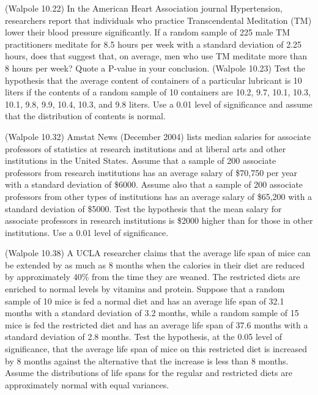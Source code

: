 \documentclass[14pt]{exam}
\begin{document}
\begin{questions}

            \question
            (Walpole 10.22)
            In the American Heart Association journal Hypertension, researchers report that individuals who practice Transcendental Meditation (TM) lower their blood pressure significantly. If a random sample of 225 male TM practitioners meditate for 8.5 hours per week with a standard deviation of 2.25 hours, does that suggest that, on average, men who use TM meditate more than 8 hours per week? Quote a P-value in your conclusion.
            \question
            (Walpole 10.23)
            Test the hypothesis that the average content of containers of a particular lubricant is 10 liters if the contents of a random sample of 10 containers are 10.2, 9.7, 10.1, 10.3, 10.1, 9.8, 9.9, 10.4, 10.3, and 9.8 liters. Use a 0.01 level of significance and assume that the distribution of contents is normal.

            \question
            (Walpole 10.32)
            Amstat News (December 2004) lists median salaries for associate professors of statistics at research institutions and at liberal arts and other institutions in the United States. Assume that a sample of 200 associate professors from research institutions has an average salary of \$70,750 per year with a standard deviation of \$6000. Assume also that a sample of 200 associate professors from other types of institutions has an average salary of \$65,200 with a standard deviation of \$5000. Test the hypothesis that the mean salary for associate professors in research institutions is \$2000 higher than for those in other institutions. Use a 0.01 level of significance.

            \question
            (Walpole 10.38)
            A UCLA researcher claims that the average life span of mice can be extended by as much as 8 months when the calories in their diet are reduced by approximately 40\% from the time they are weaned. The restricted diets are enriched to normal levels by vitamins and protein. Suppose that a random sample of 10 mice is fed a normal diet and has an average life span of 32.1 months with a standard deviation of 3.2 months, while a random sample of 15 mice is fed the restricted diet and has an average life span of 37.6 months with a standard deviation of 2.8 months. Test the hypothesis, at the 0.05 level of significance, that the average life span of mice on this restricted diet is increased by 8 months against the alternative that the increase is less than 8 months. Assume the distributions of life spans for the regular and restricted diets are approximately normal with equal variances.


\end{questions}
\end{document}
